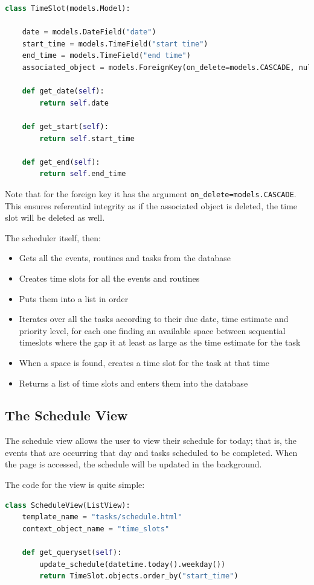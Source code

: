 \documentclass{article}
\begin{document}
\begin{lstlisting}[language=Python]
class TimeSlot(models.Model):

    date = models.DateField("date")
    start_time = models.TimeField("start time")
    end_time = models.TimeField("end time")
    associated_object = models.ForeignKey(on_delete=models.CASCADE, null=True)

    def get_date(self):
        return self.date

    def get_start(self):
        return self.start_time

    def get_end(self):
        return self.end_time
\end{lstlisting}

Note that for the foreign key it has the argument \texttt{on\_delete=models.CASCADE}.
This ensures referential integrity as if the associated object is deleted,
the time slot will be deleted as well.

The scheduler itself, then:
\begin{itemize}
	\item Gets all the events, routines and tasks from the database
	\item Creates time slots for all the events and routines
	\item Puts them into a list in order
	\item Iterates over all the tasks according to their due date, time estimate and priority level,
	      for each one finding an available space between sequential timeslots
	      where the gap it at least as large as the time estimate for the task
	\item When a space is found, creates a time slot for the task at that time
	\item Returns a list of time slots and enters them into the database
\end{itemize}

\subsection{The Schedule View}
The schedule view allows the user to view their schedule for today;
that is,
the events that are occurring that day and tasks scheduled to be completed.
When the page is accessed,
the schedule will be updated in the background.

The code for the view is quite simple:
\begin{lstlisting}[language=Python]
class ScheduleView(ListView):
    template_name = "tasks/schedule.html"
    context_object_name = "time_slots"

    def get_queryset(self):
        update_schedule(datetime.today().weekday())
        return TimeSlot.objects.order_by("start_time")
\end{lstlisting}
\end{document}
